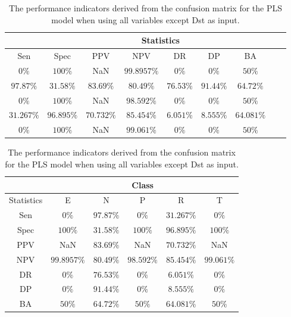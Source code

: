 \begin{table}[!ht]
	\centering
	\begin{tabular}{|c|c|c|c|c|c|c|c|c|}
		\hline
		 & \multicolumn{7}{c|}{Statistics} \\ \hline
		Sen & Spec & PPV & NPV & DR & DP & BA \\ \hline
		$0\%$ & $100\%$ & NaN & $99.8957\%$ & $0\%$ & $0\%$ & $50\%$ \\ \hline
		$97.87\%$ & $31.58\%$ & $83.69\%$ & $80.49\%$ & $76.53\%$ & $91.44\%$ & $64.72\%$ \\ \hline
		$0\%$ & $100\%$ & NaN & $98.592\%$ & $0\%$ & $0\%$ & $50\%$ \\ \hline
		$31.267\%$ & $96.895\%$ & $70.732\%$ & $85.454\%$ & $6.051\%$ & $8.555\%$ & $64.081\%$ \\ \hline
		$0\%$ & $100\%$ & NaN & $99.061\%$ & $0\%$ & $0\%$ & $50\%$ \\ \hline
	\end{tabular}
	\caption{The performance indicators derived from the confusion matrix for the PLS model when using all variables except Dst as input.}
	\label{tab:cs:noDst:pls}
\end{table}

\begin{table}[!ht]
	\centering
	\begin{tabular}{|c|c|c|c|c|c|}
		\hline
		 & \multicolumn{5}{c|}{Class} \\ \hline
		Statistics & E & N & P & R & T \\ \hline
		Sen & $0\%$ & $97.87\%$ & $0\%$ & $31.267\%$ & $0\%$ \\ \hline
		Spec & $100\%$ & $31.58\%$ & $100\%$ & $96.895\%$ & $100\%$ \\ \hline
		PPV & NaN & $83.69\%$ & NaN & $70.732\%$ & NaN \\ \hline
		NPV & $99.8957\%$ & $80.49\%$ & $98.592\%$ & $85.454\%$ & $99.061\%$ \\ \hline
		DR & $0\%$ & $76.53\%$ & $0\%$ & $6.051\%$ & $0\%$ \\ \hline
		DP & $0\%$ & $91.44\%$ & $0\%$ & $8.555\%$ & $0\%$ \\ \hline
		BA & $50\%$ & $64.72\%$ & $50\%$ & $64.081\%$ & $50\%$ \\ \hline
	\end{tabular}
	\caption{The performance indicators derived from the confusion matrix for the PLS model when using all variables except Dst as input.}
	\label{tab:cs:reverse:noDst:pls}
\end{table}

